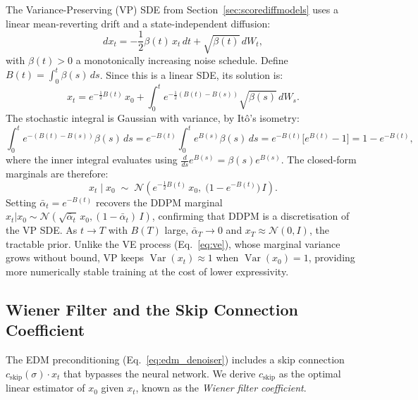 The Variance-Preserving (VP) SDE from Section~\ref{sec:scorediffmodels}
uses a linear mean-reverting drift and a state-independent diffusion:
\[
    dx_t = -\frac{1}{2}\beta(t)\,x_t\,dt + \sqrt{\beta(t)}\,dW_t,
\]
with $\beta(t) > 0$ a monotonically increasing noise schedule. Define
$B(t) = \int_0^t \beta(s)\,ds$. Since this is a linear SDE, its solution is:
\[
    x_t = e^{-\frac{1}{2}B(t)}\,x_0
    + \int_0^t e^{-\frac{1}{2}(B(t)-B(s))}\sqrt{\beta(s)}\,dW_s.
\]
The stochastic integral is Gaussian with variance, by It\^{o}'s isometry:
\[
    \int_0^t e^{-(B(t)-B(s))}\beta(s)\,ds
    = e^{-B(t)}\int_0^t e^{B(s)}\beta(s)\,ds
    = e^{-B(t)}\bigl[e^{B(t)}-1\bigr]
    = 1 - e^{-B(t)},
\]
where the inner integral evaluates using $\frac{d}{ds}e^{B(s)}=\beta(s)e^{B(s)}$.
The closed-form marginals are therefore:
\begin{equation}
    \label{eq:vp_marginal}
    x_t \mid x_0 \;\sim\; \mathcal{N}\!\left(
    e^{-\frac{1}{2}B(t)}\,x_0,\;\bigl(1 - e^{-B(t)}\bigr)\,I\right).
\end{equation}
Setting $\bar{\alpha}_t = e^{-B(t)}$ recovers the DDPM \cite{ho2020ddpm} marginal
$x_t|x_0 \sim \mathcal{N}(\sqrt{\bar\alpha_t}\,x_0,(1-\bar\alpha_t)\,I)$,
confirming that DDPM is a discretisation of the VP SDE. As $t\to T$ with
$B(T)$ large, $\bar\alpha_T\to 0$ and $x_T\approx\mathcal{N}(0,I)$, the
tractable prior. Unlike the VE process (Eq.~\ref{eq:ve}), whose marginal
variance grows without bound, VP keeps $\operatorname{Var}(x_t)\approx 1$
when $\operatorname{Var}(x_0)=1$, providing more numerically stable training
at the cost of lower expressivity.

\subsection{Wiener Filter and the Skip Connection Coefficient}
\label{app:subsec:wiener}

The EDM preconditioning (Eq.~\ref{eq:edm_denoiser}) includes a skip connection
$c_{\text{skip}}(\sigma)\cdot x_t$ that bypasses the neural network. We derive
$c_{\text{skip}}$ as the optimal linear estimator of $x_0$ given $x_t$,
known as the \textit{Wiener filter coefficient}.\\

